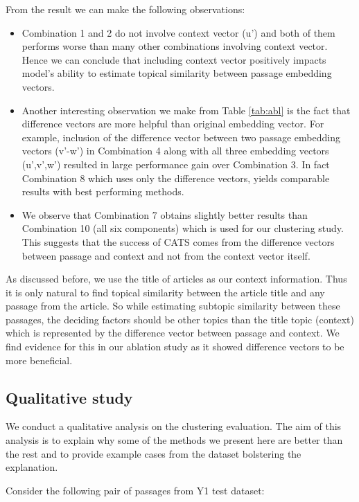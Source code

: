 \documentclass[sigconf,authordraft]{acmart}
\begin{document}
From the result we can make the following observations:
\begin{itemize}
    \item Combination 1 and 2 do not involve context vector (u') and both of them performs worse than many other combinations involving context vector. Hence we can conclude that including context vector positively impacts model's ability to estimate topical similarity between passage embedding vectors.
    \item Another interesting observation we make from Table \ref{tab:abl} is the fact that difference vectors are more helpful than original embedding vector. For example, inclusion of the difference vector between two passage embedding vectors (v'-w') in Combination 4 along with all three embedding vectors (u',v',w') resulted in large performance gain over Combination 3. In fact Combination 8 which uses only the difference vectors, yields comparable results with best performing methods.
    \item We observe that Combination 7 obtains slightly better results than Combination 10 (all six components) which is used for our clustering study. This suggests that the success of CATS comes from the difference vectors between passage and context and not from the context vector itself. 
\end{itemize}

As discussed before, we use the title of articles as our context information. Thus it is only natural to find topical similarity between the article title and any passage from the article. So while estimating subtopic similarity between these passages, the deciding factors should be other topics than the title topic (context) which is represented by the difference vector between passage and context. We find evidence for this in our ablation study as it showed difference vectors to be more beneficial. 

\subsection{Qualitative study} We conduct a qualitative analysis on the clustering evaluation. The aim of this analysis is to explain why some of the methods we present here are better than the rest and to provide example cases from the dataset bolstering the explanation.

Consider the following pair of passages from Y1 test dataset:

\noindent{}
\end{document}
